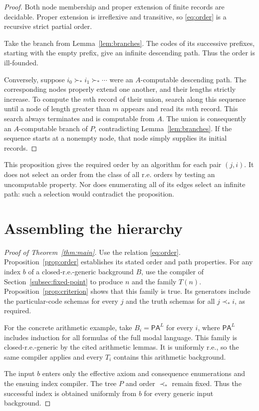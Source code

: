 \documentclass[11pt]{article}
\theoremstyle{definition}
\newcommand{\PA}{\mathsf{PA}}
\begin{document}
\begin{proof}
Both node membership and proper extension of finite records are decidable.
Proper extension is irreflexive and transitive, so \eqref{eq:order} is a
recursive strict partial order.

Take the branch from Lemma~\ref{lem:branches}. The codes of its successive
prefixes, starting with the empty prefix, give an infinite descending
path. Thus the order is ill-founded.

Conversely, suppose $i_0\succ_*i_1\succ_*\cdots$ were an $A$-computable
descending path. The corresponding nodes properly extend one another,
and their lengths strictly increase. To compute the $m$th record of
their union, search along this sequence until a node of length greater
than $m$ appears and read its $m$th record. This search always terminates
and is computable from $A$. The union is consequently an $A$-computable
branch of $P$, contradicting Lemma~\ref{lem:branches}. If the sequence
starts at a nonempty node, that node simply supplies its initial records.
\end{proof}

This proposition gives the required order by an algorithm for each pair
$(j,i)$. It does not select an order from the class of all r.e. orders by
testing an uncomputable property. Nor does enumerating all of its edges
select an infinite path: such a selection would contradict the proposition.

\section{Assembling the hierarchy}\label{sec:assembly}

\begin{proof}[Proof of Theorem~\ref{thm:main}]
Use the relation \eqref{eq:order}. Proposition~\ref{prop:order} establishes
its stated order and path properties. For any index $b$ of a
closed-r.e.-generic background $B$, use the compiler of
Section~\ref{subsec:fixed-point} to produce $n$ and the family $T(n)$.
Proposition~\ref{prop:criterion} shows that this family is true. Its
generators include the particular-code schemas for every $j$ and the
truth schemas for all $j\prec_*i$, as required.

For the concrete arithmetic example, take $B_i=\PA^L$ for every $i$,
where $\PA^L$ includes induction for all formulas of the full modal
language. This family is closed-r.e.-generic by the cited arithmetic
lemmas. It is uniformly r.e., so the same compiler applies and every
$T_i$ contains this arithmetic background.

The input $b$ enters only the effective axiom and consequence enumerations
and the ensuing index compiler. The tree $P$ and order $\prec_*$ remain
fixed. Thus the successful index is obtained uniformly from $b$ for every
generic input background.
\end{proof}
\end{document}
